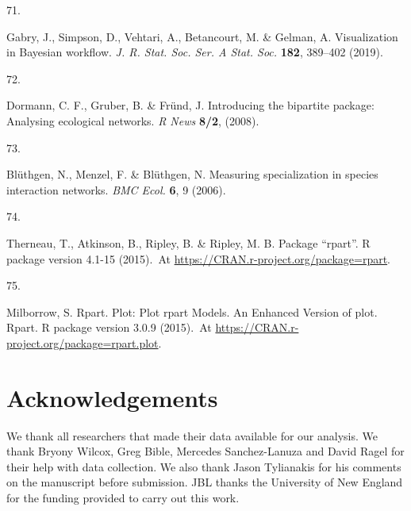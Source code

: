 \documentclass[
  12pt,
  a4paper,
]{article}
\newlength{\cslhangindent}
\newlength{\csllabelwidth}
\newlength{\cslentryspacingunit} %
\newenvironment{CSLReferences}[2] %
 {%
  \setlength{\parindent}{0pt}
  \ifodd #1
  \let\oldpar\par
  \def\par{\hangindent=\cslhangindent\oldpar}
  \fi
  \setlength{\parskip}{#2\cslentryspacingunit}
 }%
 {}
\newcommand{\CSLLeftMargin}[1]{\parbox[t]{\csllabelwidth}{#1}}
\newcommand{\CSLRightInline}[1]{\parbox[t]{\linewidth - \csllabelwidth}{#1}\break}
\begin{document}
\begin{CSLReferences}{0}{0}
\leavevmode{}%
\CSLLeftMargin{71. }
\CSLRightInline{Gabry, J., Simpson, D., Vehtari, A., Betancourt, M. \& Gelman, A. Visualization in {Bayesian} workflow. \emph{J. R. Stat. Soc. Ser. A Stat. Soc.} \textbf{182}, 389--402 (2019).}

\leavevmode{}%
\CSLLeftMargin{72. }
\CSLRightInline{Dormann, C. F., Gruber, B. \& Fründ, J. Introducing the bipartite package: Analysing ecological networks. \emph{R News} \textbf{8/2}, (2008).}

\leavevmode{}%
\CSLLeftMargin{73. }
\CSLRightInline{Blüthgen, N., Menzel, F. \& Blüthgen, N. Measuring specialization in species interaction networks. \emph{BMC Ecol.} \textbf{6}, 9 (2006).}

\leavevmode{}%
\CSLLeftMargin{74. }
\CSLRightInline{Therneau, T., Atkinson, B., Ripley, B. \& Ripley, M. B. Package {``rpart''}. R package version 4.1-15 (2015).~At \href{https://CRAN.R-project.org/package=rpart}{https://CRAN.r-project.org/package=rpart}.}

\leavevmode{}%
\CSLLeftMargin{75. }
\CSLRightInline{Milborrow, S. Rpart. Plot: {Plot} rpart {Models}. {An Enhanced Version} of plot. Rpart. R package version 3.0.9 (2015).~At \href{https://CRAN.R-project.org/package=rpart.plot}{https://CRAN.r-project.org/package=rpart.plot}.}

\end{CSLReferences}

\hypertarget{acknowledgements}{%
\section{Acknowledgements}\label{acknowledgements}}

We thank all researchers that made their data available for our analysis. We thank Bryony Wilcox, Greg Bible, Mercedes Sanchez-Lanuza and David Ragel for their help with data collection. We also thank Jason Tylianakis for his comments on the manuscript before submission. JBL thanks the University of New England for the funding provided to carry out this work.
\end{document}
